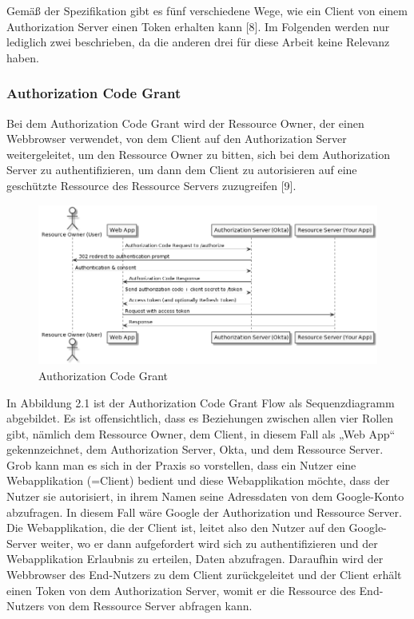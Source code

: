 Gemäß der Spezifikation gibt es fünf verschiedene Wege, wie ein Client von einem Authorization Server einen Token erhalten kann [8]. Im Folgenden werden nur lediglich zwei beschrieben, da die anderen drei für diese Arbeit keine Relevanz haben. 

\subsubsection{Authorization Code Grant}
\label{ssubsec:OAuth2:ErhaltvonToken:AuthorizationCodeGrant}
Bei dem Authorization Code Grant wird der Ressource Owner, der einen Webbrowser verwendet, von dem Client auf den Authorization Server weitergeleitet, um den Ressource Owner zu bitten, sich bei dem Authorization Server zu authentifizieren, um dann dem Client zu autorisieren auf eine geschützte Ressource des Ressource Servers zuzugreifen [9]. 

\begin{figure}[htbp]
  \centering
  \includegraphics[width=1.0\textwidth]{gfx/oauth_auth_code_flow.png}
  \caption{Authorization Code Grant}
  \label{fig:chapter02:oauth_auth_code_flow}
\end{figure}

In Abbildung 2.1 ist der Authorization Code Grant Flow als Sequenzdiagramm abgebildet. Es ist offensichtlich, dass es Beziehungen zwischen allen vier Rollen gibt, nämlich dem Ressource Owner, dem Client, in diesem Fall als „Web App“ gekennzeichnet, dem Authorization Server, Okta, und dem Ressource Server. 
Grob kann man es sich in der Praxis so vorstellen, dass ein Nutzer eine Webapplikation (=Client) bedient und diese Webapplikation möchte, dass der Nutzer sie autorisiert, in ihrem Namen seine Adressdaten von dem Google-Konto abzufragen. In diesem Fall wäre Google der Authorization und Ressource Server. Die Webapplikation, die der Client ist, leitet also den Nutzer auf den Google-Server weiter, wo er dann aufgefordert wird sich zu authentifizieren und der Webapplikation Erlaubnis zu erteilen, Daten abzufragen. Daraufhin wird der Webbrowser des End-Nutzers zu dem Client zurückgeleitet und der Client erhält einen Token von dem Authorization Server, womit er die Ressource des End-Nutzers von dem Ressource Server abfragen kann. 

